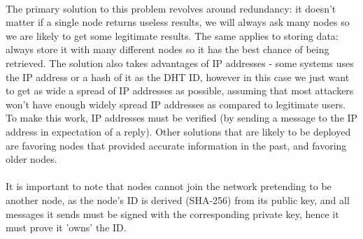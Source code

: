 \documentclass{article}
\begin{document}
\paragraph{}
The primary solution to this problem revolves around redundancy: it doesn't matter if a single node returns useless results, we will always ask many nodes so we are likely to get some legitimate results. The same applies to storing data: always store it with many different nodes so it has the best chance of being retrieved. The solution also takes advantages of IP addresses - some systems uses the IP address or a hash of it as the DHT ID, however in this case we just want to get as wide a spread of IP addresses as possible, assuming that most attackers won't have enough widely spread IP addresses as compared to legitimate users. To make this work, IP addresses must be verified (by sending a message to the IP address in expectation of a reply). Other solutions that are likely to be deployed are favoring nodes that provided accurate information in the past, and favoring older nodes.

\paragraph{}
It is important to note that nodes cannot join the network pretending to be another node, as the node's ID is derived (SHA-256) from its public key, and all messages it sends must be signed with the corresponding private key, hence it must prove it 'owns' the ID.
\end{document}
